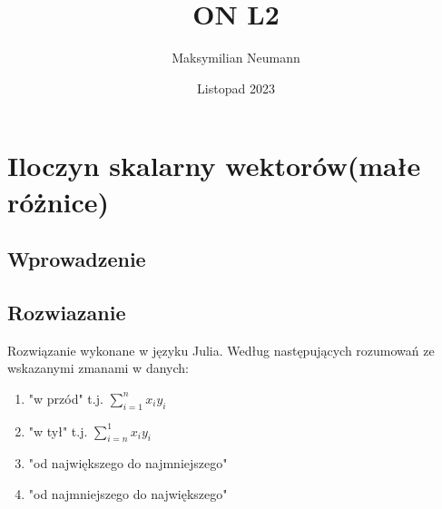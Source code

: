 \documentclass{article}
\title{ON L2}
\author{Maksymilian Neumann}
\date{Listopad 2023}
\begin{document}
\maketitle

\section{Iloczyn skalarny wektorów(małe różnice)}
    \subsection{Wprowadzenie}
    \subsection{Rozwiazanie}
        Rozwiązanie wykonane w języku Julia. Według następujących rozumowań ze wskazanymi zmanami w danych:
        \begin{enumerate}
            \item "w przód" t.j. $\sum^n_{i=1} x_i y_i$
            \item "w tył" t.j. $\sum^1_{i=n} x_i y_i$
            \item "od największego do najmniejszego"
            \item "od najmniejszego do największego"
        \end{enumerate}
\end{document}
